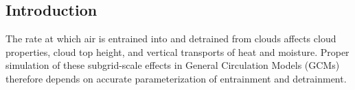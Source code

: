 \documentclass[draft,grl]{agutex}
\begin{document}
%

\begin{article}

%
%

\section{Introduction}

The rate at which air is entrained into and detrained from clouds affects cloud 
properties, cloud top height, and vertical transports of heat and moisture.  
Proper simulation of these subgrid-scale effects in General Circulation Models 
(GCMs) therefore depends on accurate parameterization of entrainment and 
detrainment.


\end{article}
\end{document}
